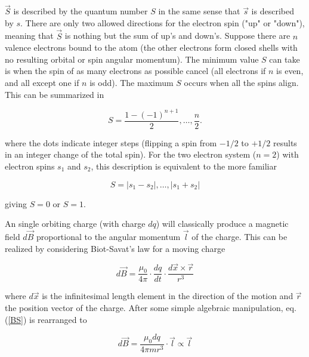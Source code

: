 \documentclass[a4paper]{article}
\begin{document}
$\vec{S}$ is described by the quantum number $S$ in the same sense that $\vec{s}$ is described by $s$. There are only two allowed directions for the electron spin ("up" or "down"), meaning that $\vec{S}$ is nothing but the sum of up's and down's. Suppose there are $n$ valence electrons bound to the atom (the other electrons form closed shells with no resulting orbital or spin angular momentum). The minimum value $S$ can take is when the spin of as many electrons as possible cancel (all electrons if $n$ is even, and all except one if $n$ is odd). The maximum $S$ occurs when all the spins align. This can be summarized in

\begin{equation}

S = \frac{1-(-1)^{n+1}}{2} , \dots , \frac{n}{2}.

\end{equation}

where the dots indicate integer steps (flipping a spin from $-1/2$ to $+1/2$ results in an integer change of the total spin). For the two electron system ($n=2$) with electron spins $s_1$ and $s_2$, this description is equivalent to the more familiar

\begin{equation}

S = |s_1 - s_2|, \dots, |s_1 + s_2|

\end{equation}

giving $S=0$ or $S=1$.

An single orbiting charge (with charge $dq$) will classically produce a magnetic field $d\vec{B}$ proportional to the angular momentum $\vec{l}$ of the charge. This can be realized by considering Biot-Savat's law for a moving charge

\begin{equation}

d\vec{B} = \frac{\mu_0}{4\pi} \cdot \frac{dq}{dt} \cdot \frac{d\vec{x} \times \vec{r}}{r^3} \label{BS}

\end{equation}

where $d\vec{x}$ is the infinitesimal length element in the direction of the motion and $\vec{r}$ the position vector of the charge. After some simple algebraic manipulation, eq. (\ref{BS}) is rearranged to

\begin{equation}

d\vec{B} = \frac{\mu_0 dq}{4\pi mr^3} \cdot \vec{l} \propto \vec{l} \label{propL}

\end{equation}
\end{document}
